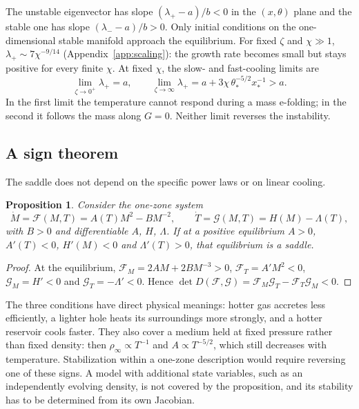 \documentclass[11pt,a4paper]{article}
\newtheorem{proposition}{Proposition}
\begin{document}
The unstable eigenvector has slope $(\lambda_+-a)/b<0$ in the $(x,\theta)$ plane and the stable one has slope $(\lambda_--a)/b>0$. Only initial conditions on the one-dimensional stable manifold approach the equilibrium. For fixed $\zeta$ and $\chi\gg1$, $\lambda_+\sim7\chi^{-9/14}$ (Appendix~\ref{app:scaling}): the growth rate becomes small but stays positive for every finite $\chi$. At fixed $\chi$, the slow- and fast-cooling limits are
\begin{equation*}
 \lim_{\zeta\to0^+}\lambda_+=a,\qquad
 \lim_{\zeta\to\infty}\lambda_+=a+3\chi\,\theta_*^{-5/2}x_*^{-1}>a.
\end{equation*}
In the first limit the temperature cannot respond during a mass e-folding; in the second it follows the mass along $G=0$. Neither limit reverses the instability.

\subsection{A sign theorem}
The saddle does not depend on the specific power laws or on linear cooling.

\begin{proposition}\label{prop:sign}
Consider the one-zone system
\begin{equation*}
 \dot M=\mathcal F(M,T)=A(T)M^2-BM^{-2},\qquad
 \dot T=\mathcal G(M,T)=H(M)-\Lambda(T),
\end{equation*}
with $B>0$ and differentiable $A$, $H$, $\Lambda$. If at a positive equilibrium $A>0$, $A'(T)<0$, $H'(M)<0$ and $\Lambda'(T)>0$, that equilibrium is a saddle.
\end{proposition}
\begin{proof}
At the equilibrium, $\mathcal F_M=2AM+2BM^{-3}>0$, $\mathcal F_T=A'M^2<0$, $\mathcal G_M=H'<0$ and $\mathcal G_T=-\Lambda'<0$. Hence $\det D(\mathcal F,\mathcal G)=\mathcal F_M\mathcal G_T-\mathcal F_T\mathcal G_M<0$.
\end{proof}

The three conditions have direct physical meanings: hotter gas accretes less efficiently, a lighter hole heats its surroundings more strongly, and a hotter reservoir cools faster. They also cover a medium held at fixed pressure rather than fixed density: then $\rho_\infty\propto T^{-1}$ and $A\propto T^{-5/2}$, which still decreases with temperature. Stabilization within a one-zone description would require reversing one of these signs. A model with additional state variables, such as an independently evolving density, is not covered by the proposition, and its stability has to be determined from its own Jacobian.
\end{document}
